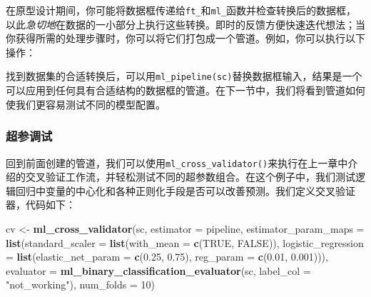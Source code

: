\documentclass[
]{article}
\newenvironment{Shaded}{\begin{snugshade}}{\end{snugshade}}
\newcommand{\CommentTok}[1]{\textcolor[rgb]{0.56,0.35,0.01}{\textit{#1}}}
\newcommand{\DataTypeTok}[1]{\textcolor[rgb]{0.13,0.29,0.53}{#1}}
\newcommand{\DecValTok}[1]{\textcolor[rgb]{0.00,0.00,0.81}{#1}}
\newcommand{\FloatTok}[1]{\textcolor[rgb]{0.00,0.00,0.81}{#1}}
\newcommand{\KeywordTok}[1]{\textcolor[rgb]{0.13,0.29,0.53}{\textbf{#1}}}
\newcommand{\NormalTok}[1]{#1}
\newcommand{\OperatorTok}[1]{\textcolor[rgb]{0.81,0.36,0.00}{\textbf{#1}}}
\newcommand{\OtherTok}[1]{\textcolor[rgb]{0.56,0.35,0.01}{#1}}
\newcommand{\StringTok}[1]{\textcolor[rgb]{0.31,0.60,0.02}{#1}}
\begin{document}
在原型设计期间，你可能将数据框传递给\texttt{ft\_}和\texttt{ml\_}函数并检查转换后的数据框，以此\emph{急切地}在数据的一小部分上执行这些转换。即时的反馈方便快速迭代想法；当你获得所需的处理步骤时，你可以将它们打包成一个管道。例如，你可以执行以下操作：

\begin{Shaded}
\end{Shaded}

找到数据集的合适转换后，可以用\texttt{ml\_pipeline(sc)}替换数据框输入，结果是一个可以应用到任何具有合适结构的数据框的管道。在下一节中，我们将看到管道如何使我们更容易测试不同的模型配置。

\hypertarget{ux8d85ux53c2ux8c03ux8bd5}{%
\subsubsection{超参调试}\label{ux8d85ux53c2ux8c03ux8bd5}}

回到前面创建的管道，我们可以使用\texttt{ml\_cross\_validator()}来执行在上一章中介绍的交叉验证工作流，并轻松测试不同的超参数组合。在这个例子中，我们测试逻辑回归中变量的中心化和各种正则化手段是否可以改善预测。我们定义交叉验证器，代码如下：

\begin{Shaded}
\begin{Highlighting}[]
\NormalTok{cv <-}\StringTok{ }\KeywordTok{ml_cross_validator}\NormalTok{(sc, }\DataTypeTok{estimator =}\NormalTok{ pipeline, }\DataTypeTok{estimator_param_maps =} \KeywordTok{list}\NormalTok{(}\DataTypeTok{standard_scaler =} \KeywordTok{list}\NormalTok{(}\DataTypeTok{with_mean =} \KeywordTok{c}\NormalTok{(}\OtherTok{TRUE}\NormalTok{, }
    \OtherTok{FALSE}\NormalTok{)), }\DataTypeTok{logistic_regression =} \KeywordTok{list}\NormalTok{(}\DataTypeTok{elastic_net_param =} \KeywordTok{c}\NormalTok{(}\FloatTok{0.25}\NormalTok{, }\FloatTok{0.75}\NormalTok{), }\DataTypeTok{reg_param =} \KeywordTok{c}\NormalTok{(}\FloatTok{0.01}\NormalTok{, }
    \FloatTok{0.001}\NormalTok{))), }\DataTypeTok{evaluator =} \KeywordTok{ml_binary_classification_evaluator}\NormalTok{(sc, }\DataTypeTok{label_col =} \StringTok{"not_working"}\NormalTok{), }
    \DataTypeTok{num_folds =} \DecValTok{10}\NormalTok{)}
\end{Highlighting}
\end{Shaded}
\end{document}
